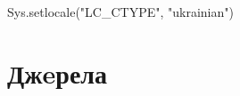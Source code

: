 \documentclass[
]{book}
\newenvironment{Shaded}{\begin{snugshade}}{\end{snugshade}}
\newcommand{\FunctionTok}[1]{\textcolor[rgb]{0.00,0.00,0.00}{#1}}
\newcommand{\NormalTok}[1]{#1}
\newcommand{\StringTok}[1]{\textcolor[rgb]{0.31,0.60,0.02}{#1}}
\begin{document}
\begin{Shaded}
\begin{Highlighting}[]
\FunctionTok{Sys.setlocale}\NormalTok{(}\StringTok{"LC\_CTYPE"}\NormalTok{, }\StringTok{"ukrainian"}\NormalTok{)}
\end{Highlighting}
\end{Shaded}

\hypertarget{ux434ux436eux440ux435ux43bux430}{%
\chapter*{Джeрела}\label{ux434ux436eux440ux435ux43bux430}}

  
\end{document}
